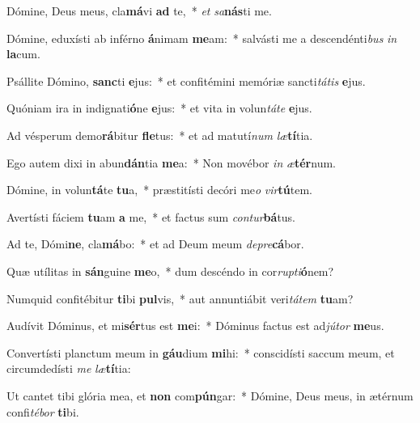 \item Dómine, Deus meus, cla\textbf{má}vi \textbf{ad} te,~* \textit{et} \textit{sa}\textbf{nás}ti me.
\item Dómine, eduxísti ab inférno \textbf{á}nimam \textbf{me}am:~* salvásti me a descendénti\textit{bus} \textit{in} \textbf{la}cum.
\item Psállite Dómino, \textbf{sanc}ti \textbf{e}jus:~* et confitémini memóriæ sancti\textit{tá}\textit{tis} \textbf{e}jus.
\item Quóniam ira in indignati\textbf{ó}ne \textbf{e}jus:~* et vita in volun\textit{tá}\textit{te} \textbf{e}jus.
\item Ad vésperum demo\textbf{rá}bitur \textbf{fle}tus:~* et ad matutí\textit{num} \textit{læ}\textbf{tí}tia.
\item Ego autem dixi in abun\textbf{dán}tia \textbf{me}a:~* Non movébor \textit{in} \textit{æ}\textbf{tér}num.
\item Dómine, in volun\textbf{tá}te \textbf{tu}a,~* præstitísti decóri me\textit{o} \textit{vir}\textbf{tú}tem.
\item Avertísti fáciem \textbf{tu}am \textbf{a} me,~* et factus sum \textit{con}\textit{tur}\textbf{bá}tus.
\item Ad te, Dómi\textbf{ne}, cla\textbf{má}bo:~* et ad Deum meum \textit{de}\textit{pre}\textbf{cá}bor.
\item Quæ utílitas in \textbf{sán}guine \textbf{me}o,~* dum descéndo in cor\textit{rup}\textit{ti}\textbf{ó}nem?
\item Numquid confitébitur \textbf{ti}bi \textbf{pul}vis,~* aut annuntiábit veri\textit{tá}\textit{tem} \textbf{tu}am?
\item Audívit Dóminus, et mi\textbf{sér}tus est \textbf{me}i:~* Dóminus factus est ad\textit{jú}\textit{tor} \textbf{me}us.
\item Convertísti planctum meum in \textbf{gáu}dium \textbf{mi}hi:~* conscidísti saccum meum, et circumdedísti \textit{me} \textit{læ}\textbf{tí}tia:
\item Ut cantet tibi glória mea, et \textbf{non} com\textbf{pún}gar:~* Dómine, Deus meus, in ætérnum confi\textit{té}\textit{bor} \textbf{ti}bi.
